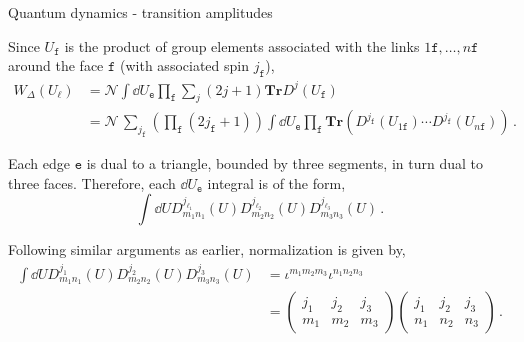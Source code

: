 \documentclass[12pt,titlepage]{article}
\begin{document}
\begin{frame}{Quantum dynamics - transition amplitudes}
    \begin{list}{\,}{\leftmargin=1em \itemindent=0em}
        \item<1-> Since $U_\mathtt{f}$ is the product of group elements associated with the links $1\mathtt{f},\dots,n\mathtt{f}$ around the face $\mathtt{f}$ (with associated spin $j_\mathtt{f}$),
        \begin{align}
            W_\Delta(U_\ell)&=\mathcal{N}\int\dd{U_\mathtt{e}}\prod_\mathtt{f}\sum_j(2j+1)\mathbf{Tr}D^{j}(U_\mathtt{f})\,\\
            &=\mathcal{N}\,\sum_{j_\mathtt{f}}\left(\prod_\mathtt{f}(2j_\mathtt{f}+1)\right)\int\dd{U_\mathtt{e}}\prod_\mathtt{f}\mathbf{Tr}\left(D^{j_\mathtt{f}}(U_{1\mathtt{f}})\cdots D^{j_\mathtt{f}}(U_{n\mathtt{f}})\right)\,.
        \end{align}
        \item<2-> Each edge $\mathtt{e}$ is dual to a triangle, bounded by three segments, in turn dual to three faces. Therefore, each $\dd{U_\mathtt{e}}$ integral is of the form,
        \begin{equation}
            \int\dd{U}D^{j_{\ell_1}}_{m_1n_1}(U)D^{j_{\ell_2}}_{m_2n_2}(U)D^{j_{\ell_3}}_{m_3n_3}(U)\,.
        \end{equation}
        \item<3-> Following similar arguments as earlier, normalization is given by,
        \begin{align}
            \int\dd{U}D^{j_{1}}_{m_1n_1}(U)D^{j_{2}}_{m_2n_2}(U)D^{j_{3}}_{m_3n_3}(U)&=\iota^{m_1m_2m_3}\iota^{n_1n_2n_3} \\ &=
            \begin{pmatrix}
                j_1 & j_2 & j_3 \\
                m_1 & m_2 & m_3
            \end{pmatrix}
            \begin{pmatrix}
                j_1 & j_2 & j_3 \\
                n_1 & n_2 & n_3
            \end{pmatrix}\,.
        \end{align}
    \end{list}
\end{frame}
\end{document}
